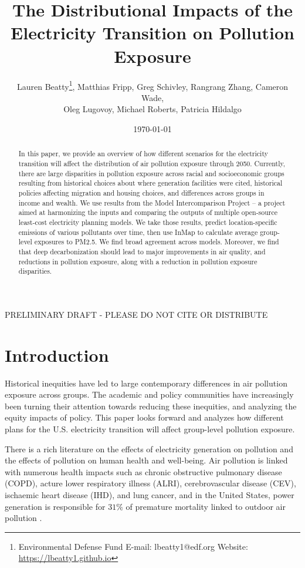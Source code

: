 \documentclass[a4paper]{article}
\title{The Distributional Impacts of the Electricity Transition on Pollution Exposure}
\author{Lauren Beatty\thanks{Environmental Defense Fund  \hspace{.5cm} E-mail: lbeatty1@edf.org \hspace{.5cm}Website: \href{https://lbeatty1.github.io}{https://lbeatty1.github.io}}, 
Matthias Fripp, 
Greg Schivley, 
Rangrang Zhang, 
Cameron Wade, \\ 
Oleg Lugovoy, 
Michael Roberts, 
Patricia Hildalgo}
\date{\today}
\theoremstyle{definition}
\theoremstyle{plain}
\begin{document}
\maketitle
\begin{center}
    PRELIMINARY DRAFT - PLEASE DO NOT CITE OR DISTRIBUTE
\end{center}

\begin{abstract}
    In this paper, we provide an overview of how different scenarios for the electricity transition will affect the distribution of air pollution exposure through 2050.  Currently, there are large disparities in pollution exposure across racial and socioeconomic groups resulting from historical choices about where generation facilities were cited, historical policies affecting migration and housing choices, and differences across groups in income and wealth. We use results from the Model Intercomparison Project -- a project aimed at harmonizing the inputs and comparing the outputs of multiple open-source least-cost electricity planning models.  We take those results, predict location-specific emissions of various pollutants over time, then use InMap to calculate average group-level exposures to PM2.5.  We find broad agreement across models.  Moreover, we find that deep decarbonization should lead to major improvements in air quality, and reductions in pollution exposure, along with a reduction in pollution exposure disparities.
\end{abstract}

\newpage
\section{Introduction}
Historical inequities have led to large contemporary differences in air pollution exposure across groups.  The academic and policy communities have increasingly been turning their attention towards reducing these inequities, and analyzing the equity impacts of policy.  This paper looks forward and analyzes how different plans for the U.S. electricity transition will affect group-level pollution exposure. 


There is a rich literature on the effects of electricity generation on pollution and the effects of pollution on human health and well-being. Air pollution is linked with numerous health impacts such as chronic obstructive pulmonary disease (COPD), acture lower respiratory illness (ALRI), cerebrovascular disease (CEV), ischaemic heart disease (IHD), and lung cancer, and in the United States, power generation is responsible for $31\%$ of premature mortality linked to outdoor air pollution \citep{Lelieveld2015TheScale}.
\end{document}
